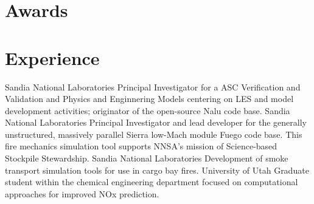 \documentclass[letterpaper]{twentysecondcv_spd} %
\begin{document}
\section{Awards}

\begin{twentyshort} %
\end{twentyshort}



\section{Experience}

\begin{twenty} %
	 {Sandia National Laboratories} {Principal 
Investigator for a ASC Verification and Validation and Physics and Enginnering Models centering on LES and model 
development activities; originator of the open-source Nalu code base.}
	 {Sandia National Laboratories}  {Principal Investigator
 and lead developer for the generally unstructured, massively parallel Sierra low-Mach module Fuego code base. This fire mechanics
simulation tool supports NNSA's mission of Science-based Stockpile Stewardship.}
	 {Sandia National Laboratories} {Development of smoke transport simulation
tools for use in cargo bay fires.}
	 {University of Utah} {Graduate student within the chemical engineering department
 focused on computational approaches for improved NOx prediction.}
\end{twenty}

\end{document}
